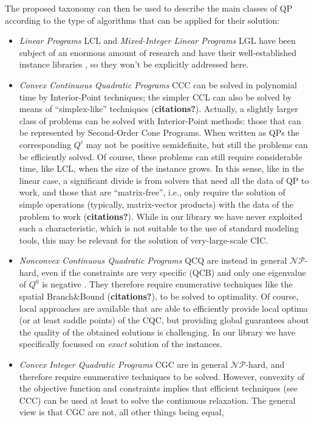 The proposed taxonomy can then be used to describe the main classes of QP according to the type of algorithms that can be applied for their solution:
%
\begin{itemize}
 \item \emph{Linear Programs} LCL and \emph{Mixed-Integer Linear Programs} LGL have been subject of an enormous amount of research and have their well-established instance libraries \cite{Koch2011}, so they won't be explicitly addressed here.
 \item \emph{Convex Continuous Quadratic Programs} CCC can be solved in polynomial time by Interior-Point techniques; the simpler CCL can also be solved by means of ``simplex-like'' techniques ({\bf citations?}). Actually, a slightly larger class of problems can be solved with Interior-Point methods: those that can be represented by Second-Order Cone Programs. When written as QPs the corresponding $Q^i$ may not be positive semidefinite, but still the problems can be efficiently solved. Of course, these problems can still require considerable time, like LCL, when the size of the instance grows. In this sense, like in the linear case, a significant divide is from solvers that need all the data of QP to work, and those that are ``matrix-free'', i.e., only require the solution of simple operations (typically, matrix-vector products) with the data of the problem to work ({\bf citations?}). While in our library we have never exploited such a characteristic, which is not suitable to the use of standard modeling tools, this may be relevant for the solution of very-large-scale CIC.
 \item \emph{Nonconvex Continuous Quadratic Programs} QCQ are instead in general $\mathcal{NP}$-hard, even if the constraints are very specific (QCB) and only one eigenvalue of $Q^0$ is negative \cite{Hemmecke2010}. They therefore require enumerative techniques like the spatial Branch\&Bound ({\bf citations?}), to be solved to optimality. Of course, local approaches 
are available that are able to
efficiently provide local optima (or at least saddle points) of the CQC, but providing global guarantees about the quality of the obtained solutions is challenging. In our library we have specifically focussed on  \emph{exact} solution of the instances.
 \item \emph{Convex Integer Quadratic Programs} CGC are in general $\mathcal{NP}$-hard, and therefore require enumerative techniques to be solved. However, convexity of the objective function and constraints implies that efficient techniques (see CCC) can be used at least to solve the continuous relaxation. The general view is that CGC are not, all other things being equal, 

\end{itemize}
